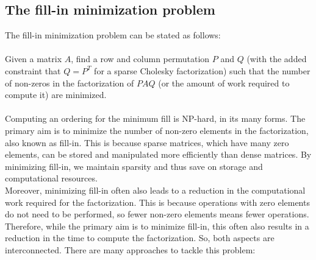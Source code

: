 \documentclass[11pt]{book}
\begin{document}
\subsection*{The fill-in minimization problem}
The fill-in minimization problem can be stated as follows:\\ \\
Given a matrix $A$, find a row and column permutation $P$ and $Q$ (with the added constraint that $Q=P^{T}$ for a sparse Cholesky factorization) such that the number of non-zeros in the factorization of $PAQ$ (or the amount of work required to compute it) are minimized.\\ \\
Computing an ordering for the minimum fill is NP-hard, in its many forms. The primary aim is to minimize the number of non-zero elements in the factorization, also known as fill-in. This is because sparse matrices, which have many zero elements, can be stored and manipulated more efficiently than dense matrices. By minimizing fill-in, we maintain sparsity and thus save on storage and computational resources.\\
Moreover, minimizing fill-in often also leads to a reduction in the computational work required for the factorization. This is because operations with zero elements do not need to be performed, so fewer non-zero elements means fewer operations. Therefore, while the primary aim is to minimize fill-in, this often also results in a reduction in the time to compute the factorization. So, both aspects are interconnected. There are many approaches to tackle this problem:
\end{document}
